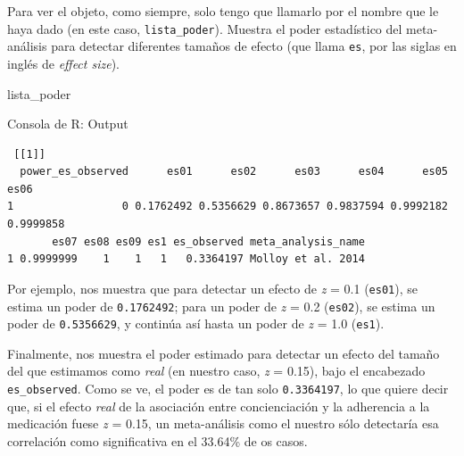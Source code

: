 \documentclass[
  bookmarksnumbered]{article}
\newenvironment{Shaded}{\begin{snugshade}}{\end{snugshade}}
\newcommand{\FunctionTok}[1]{\textcolor[rgb]{0.39,0.29,0.61}{#1}}
\newcommand{\NormalTok}[1]{\textcolor[rgb]{0.12,0.11,0.11}{#1}}
\newcommand{\OtherTok}[1]{\textcolor[rgb]{0.00,0.43,0.16}{#1}}
\newcommand{\SpecialCharTok}[1]{\textcolor[rgb]{0.24,0.68,0.91}{#1}}
\begin{document}
\begin{Shaded}
\end{Shaded}

Para ver el objeto, como siempre, solo tengo que llamarlo por el nombre que le haya dado (en este caso, \texttt{lista\_poder}). Muestra el poder estadístico del meta-análisis para detectar diferentes tamaños de efecto (que llama \texttt{es}, por las siglas en inglés de \emph{effect size}).

\begin{Shaded}
\begin{Highlighting}[]
\NormalTok{lista\_poder}
\end{Highlighting}
\end{Shaded}

\begin{ROut}{Consola de R: Output~\thetcbcounter}
                \begin{footnotesize}
                \begin{verbatim} [[1]]
  power_es_observed      es01      es02      es03      es04      es05      es06
1                 0 0.1762492 0.5356629 0.8673657 0.9837594 0.9992182 0.9999858
       es07 es08 es09 es1 es_observed meta_analysis_name
1 0.9999999    1    1   1   0.3364197 Molloy et al. 2014
 \end{verbatim}
                \end{footnotesize}
                \end{ROut}

Por ejemplo, nos muestra que para detectar un efecto de \emph{z} = 0.1 (\texttt{es01}), se estima un poder de \texttt{0.1762492}; para un poder de \emph{z} = 0.2 (\texttt{es02}), se estima un poder de \texttt{0.5356629}, y continúa así hasta un poder de \emph{z} = 1.0 (\texttt{es1}).

Finalmente, nos muestra el poder estimado para detectar un efecto del tamaño del que estimamos como \emph{real} (en nuestro caso, \emph{z} = 0.15), bajo el encabezado \texttt{es\_observed}. Como se ve, el poder es de tan solo \texttt{0.3364197}, lo que quiere decir que, si el efecto \emph{real} de la asociación entre concienciación y la adherencia a la medicación fuese \emph{z} = 0.15, un meta-análisis como el nuestro sólo detectaría esa correlación como significativa en el 33.64\% de os casos.
\end{document}
